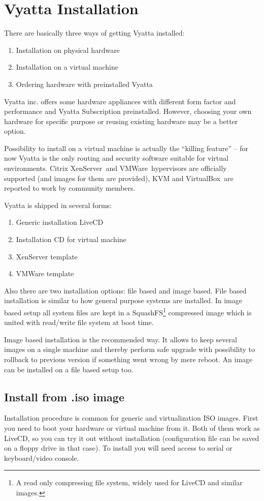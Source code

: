 \chapter{Vyatta Installation}
There are basically three ways of getting Vyatta installed:
\begin{enumerate}
 \item Installation on physical hardware
 \item Installation on a virtual machine
 \item Ordering hardware with preinstalled Vyatta
\end{enumerate}

Vyatta inc. offers some hardware appliances with different form factor and performance and Vyatta Subscription
preinstalled. However, choosing your own hardware for specific purpose or reusing existing hardware may be a better
option. 

Possibility to install on a virtual machine is actually the ``killing feature'' -- for now Vyatta is the only
routing and security software suitable for virtual environments. Citrix XenServer\texttrademark\ and 
VMWare\texttrademark\ hypervisors are officially supported (and images for them are provided), KVM and 
VirtualBox\texttrademark\ are reported to work by community members.

Vyatta is shipped in several forms:
\begin{enumerate}
 \item Generic installation LiveCD
 \item Installation CD for virtual machine
 \item XenServer template
 \item VMWare template
\end{enumerate}

Also there are two installation options: file based and image based. File based installation is similar to how 
general purpose systems are installed. In image based setup all system files are kept in a 
SquashFS\footnote{A read only compressing file system, widely used for LiveCD and similar images.} compressed image
which is united with read/write file system at boot time.

Image based installation is the recommended way. It allows to keep several images on a single machine and thereby 
perform safe upgrade with possibility to rollback to previous version if something went wrong by mere reboot. An image
can be installed on a file based setup too.

\section{Install from .iso image}
Installation procedure is common for generic and virtualization ISO images. First you need to boot your hardware or
virtual machine from it. Both of them work as LiveCD, so you can try it out without installation (configuration file
can be saved on a floppy drive in that case). To install you will need access to serial or keyboard/video console.

